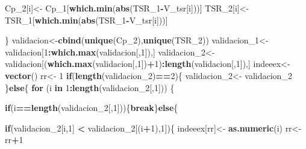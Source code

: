 \documentclass[]{article}
\newenvironment{Shaded}{\begin{snugshade}}{\end{snugshade}}
\newcommand{\KeywordTok}[1]{\textcolor[rgb]{0.13,0.29,0.53}{\textbf{#1}}}
\newcommand{\DecValTok}[1]{\textcolor[rgb]{0.00,0.00,0.81}{#1}}
\newcommand{\StringTok}[1]{\textcolor[rgb]{0.31,0.60,0.02}{#1}}
\newcommand{\ControlFlowTok}[1]{\textcolor[rgb]{0.13,0.29,0.53}{\textbf{#1}}}
\newcommand{\OperatorTok}[1]{\textcolor[rgb]{0.81,0.36,0.00}{\textbf{#1}}}
\newcommand{\NormalTok}[1]{#1}
\begin{document}
\begin{Shaded}
\begin{Highlighting}[]
{{\NormalTok{        Cp_}\DecValTok{2}\NormalTok{[i]<-}\StringTok{ }\NormalTok{Cp_}\DecValTok{1}\NormalTok{[}\KeywordTok{which.min}\NormalTok{(}\KeywordTok{abs}\NormalTok{(TSR_}\DecValTok{1}\OperatorTok{-}\NormalTok{V_tsr[i]))]}
\NormalTok{        TSR_}\DecValTok{2}\NormalTok{[i]<-TSR_}\DecValTok{1}\NormalTok{[}\KeywordTok{which.min}\NormalTok{(}\KeywordTok{abs}\NormalTok{(TSR_}\DecValTok{1}\OperatorTok{-}\NormalTok{V_tsr[i]))]}
        
\NormalTok{      \}}
\NormalTok{      validacion<-}\KeywordTok{cbind}\NormalTok{(}\KeywordTok{unique}\NormalTok{(Cp_}\DecValTok{2}\NormalTok{),}\KeywordTok{unique}\NormalTok{(TSR_}\DecValTok{2}\NormalTok{))}
\NormalTok{      validacion_}\DecValTok{1}\NormalTok{<-}\StringTok{ }\NormalTok{validacion[}\DecValTok{1}\OperatorTok{:}\KeywordTok{which.max}\NormalTok{(validacion[,}\DecValTok{1}\NormalTok{]),]}
\NormalTok{      validacion_}\DecValTok{2}\NormalTok{<-}\StringTok{ }\NormalTok{validacion[(}\KeywordTok{which.max}\NormalTok{(validacion[,}\DecValTok{1}\NormalTok{])}\OperatorTok{+}\DecValTok{1}\NormalTok{)}\OperatorTok{:}\KeywordTok{length}\NormalTok{(validacion[,}\DecValTok{1}\NormalTok{]),]}
\NormalTok{      indeeex<-}\StringTok{ }\KeywordTok{vector}\NormalTok{()}
\NormalTok{      rr<-}\StringTok{ }\DecValTok{1} 
      \ControlFlowTok{if}\NormalTok{(}\KeywordTok{length}\NormalTok{(validacion_}\DecValTok{2}\NormalTok{)}\OperatorTok{==}\DecValTok{2}\NormalTok{)\{}
\NormalTok{        validacion_}\DecValTok{2}\NormalTok{<-}\StringTok{ }\NormalTok{validacion_}\DecValTok{2}
\NormalTok{      \}}\ControlFlowTok{else}\NormalTok{\{}
        \ControlFlowTok{for}\NormalTok{ (i }\ControlFlowTok{in} \DecValTok{1}\OperatorTok{:}\KeywordTok{length}\NormalTok{(validacion_}\DecValTok{2}\NormalTok{[,}\DecValTok{1}\NormalTok{])) \{}
          
          
          \ControlFlowTok{if}\NormalTok{(i}\OperatorTok{==}\KeywordTok{length}\NormalTok{(validacion_}\DecValTok{2}\NormalTok{[,}\DecValTok{1}\NormalTok{]))\{}\ControlFlowTok{break}\NormalTok{\}}\ControlFlowTok{else}\NormalTok{\{}
            
            \ControlFlowTok{if}\NormalTok{(validacion_}\DecValTok{2}\NormalTok{[i,}\DecValTok{1}\NormalTok{] }\OperatorTok{<}\StringTok{ }\NormalTok{validacion_}\DecValTok{2}\NormalTok{[(i}\OperatorTok{+}\DecValTok{1}\NormalTok{),}\DecValTok{1}\NormalTok{])\{}
\NormalTok{              indeeex[rr]<-}\StringTok{ }\KeywordTok{as.numeric}\NormalTok{(i) }
\NormalTok{              rr<-rr}\OperatorTok{+}\DecValTok{1}
              
}}
\end{Highlighting}
\end{Shaded}
\end{document}
